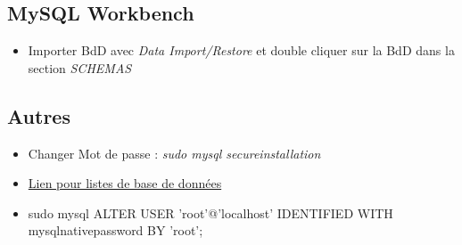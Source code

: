 \documentclass[12pt,a4paper]{article}
\begin{document}
\subsection{MySQL Workbench}
\begin{itemize}
\item Importer BdD avec \textit{Data Import/Restore} et double cliquer sur la BdD dans la section \textit{SCHEMAS}
\end{itemize}

\subsection{Autres}
\begin{itemize}
\item Changer Mot de passe : \textit{sudo mysql \textunderscore secure\textunderscore installation}
\item \href{https://archive.org/download/stackexchange}{Lien pour listes de base de données}
\item sudo mysql
\newline ALTER USER 'root'@'localhost' IDENTIFIED WITH mysql\textunderscore native\textunderscore password BY 'root';
\end{itemize}
\end{document}

